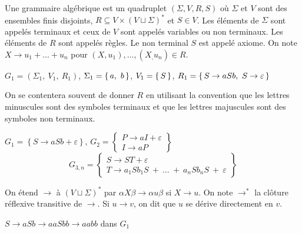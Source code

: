 \documentclass[../../agregation.tex]{subfiles}
\begin{document}

\begin{defn}
	Une grammaire algébrique est un quadruplet $(\Sigma, V, R, S)$ où $\Sigma$ et $V$ sont des ensembles finis disjoints, $R\subseteq V\times(V\sqcup\Sigma)^*$ et $S\in V$. Les éléments de $\Sigma$ sont appelés terminaux et ceux de $V$ sont appelés variables ou non terminaux. Les éléments de $R$ sont appelés règles. Le non terminal $S$ est appelé axiome. On note $X\to u_1+\dots+u_n$ pour $(X,u_1),\dots,(X_,u_n)\in R$.
\end{defn}

\begin{example}
	$G_{1}=\left(\Sigma_{1},\ V_{1},\ R_{1}\right)$, $\Sigma_{1}=\set{a,\ b}$,
	$V_{1}=\set S$, $R_{1}=\set{S\to aSb,\ S\to\varepsilon}$
\end{example}

\begin{rem}
	On se contentera souvent de donner $R$ en utilisant la convention
	que les lettres minuscules sont des symboles terminaux et que les
	lettres majuscules sont des symboles non terminaux.
\end{rem}

\begin{example}
	$G_{1}=\left\{ S\to aSb+\varepsilon\right\} $, $G_{2}=\left\{ \begin{array}{c}
	P\to aI+\varepsilon\\
	I\to aP
	\end{array}\right\} $
	$$G_{3,n}=\left\{ \begin{array}{c}
	S\to ST+\varepsilon\\
	T\to a_{1}Sb_{1}S\ +\ \dots\ +\ a_{n}Sb_{n}S\ +\ \varepsilon
	\end{array}\right\} $$
\end{example}

\begin{defn}[Dérivation]
	On étend $\to$ à $(V\sqcup\Sigma)^*$ par $\alpha X \beta \to \alpha u \beta$ si $X\to u$. On note $\to^*$ la clôture réflexive transitive de $\to$. Si $u\to v$, on dit que $u$ se dérive directement en $v$.
\end{defn}

\begin{example}
	$S\to aSb\to aaSbb\to aabb$ dans $G_{1}$
\end{example}
\end{document}
